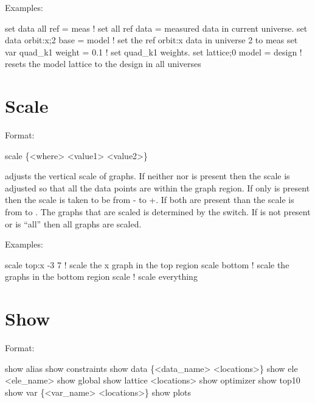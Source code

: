 Examples:
\begin{example}
  set data all ref = meas         ! set all ref data = measured data in current universe.
  set data orbit:x;2 base = model ! set the ref orbit:x data in universe 2 to meas
  set var quad\_k1 weight = 0.1   ! set quad\_k1 weights. 
  set lattice;0 model = design    ! resets the model lattice to the design in all universes
\end{example}

\section{Scale}
\label{s:scale}

Format:
\begin{example}
  scale \{<where> <value1> <value2>\}
\end{example}

\vskip 0.2in 
 adjusts the vertical scale of graphs. If neither
 nor  is present then the scale is adjusted
so that all the data points are within the graph region.  If only
 is present then the scale is taken to be from
- to +. If both are present than the scale
is from  to .  The graphs that are scaled is
determined by the  switch. If  is not present
or  is ``all'' then all graphs are scaled.

Examples:
\begin{example}
  scale top:x -3  7  ! scale the x graph in the top region
  scale bottom       ! scale the graphs in the bottom region
  scale              ! scale everything
\end{example}


\section{Show}
\label{s:show}

Format:
\begin{example}
  show alias                     
  show constraints
  show data \{<data_name> <locations>\} 
  show ele <ele_name>
  show global
  show lattice <locations>
  show optimizer
  show top10
  show var \{<var_name> <locations>\}
  show plots
\end{example}

